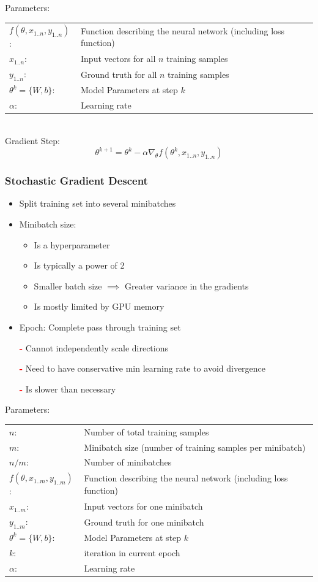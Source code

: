 \documentclass[10pt,a4paper]{article}
\newcommand{\cons}{\textcolor{red}{\textbf{-}}}
\begin{document}
Parameters: \\
\begin{tabular}{ll}
	$f(\theta, x_{1..n}, y_{1..n})$: & Function describing the neural network (including loss function) \\
	$x_{1..n}$: & Input vectors for all $n$ training samples \\
	$y_{1..n}$: & Ground truth for all $n$ training samples \\
	$\theta^k = \{W, b\}$: & Model Parameters at step $k$ \\
	$\alpha$: & Learning rate
\end{tabular} \\

Gradient Step:
$$
	\theta^{k + 1} = \theta^k - \alpha \nabla_\theta f(\theta^k, x_{1..n}, y_{1..n})
$$

\subsubsection{Stochastic Gradient Descent}
\begin{itemize}
	\item Split training set into several minibatches
	\item Minibatch size:
	\begin{itemize}
		\item Is a hyperparameter
		\item Is typically a power of 2
		\item Smaller batch size $\implies$ Greater variance in the gradients
		\item Is mostly limited by GPU memory
	\end{itemize}
	\item Epoch: Complete pass through training set
	\item[\cons] Cannot independently scale directions
	\item[\cons] Need to have conservative min learning rate to avoid divergence
	\item[\cons] Is slower than necessary
\end{itemize}

Parameters: \\
\begin{tabular}{ll}
	$n$: & Number of total training samples \\
	$m$: & Minibatch size (number of training samples per minibatch) \\
	$n/m$: & Number of minibatches \\
	$f(\theta, x_{1..m}, y_{1..m})$: & Function describing the neural network (including loss function) \\
	$x_{1..m}$: & Input vectors for one minibatch \\
	$y_{1..m}$: & Ground truth for one minibatch \\
	$\theta^k = \{W, b\}$: & Model Parameters at step $k$\\
	$k$: & iteration in current epoch \\
	$\alpha$: & Learning rate
\end{tabular} \\
\end{document}

